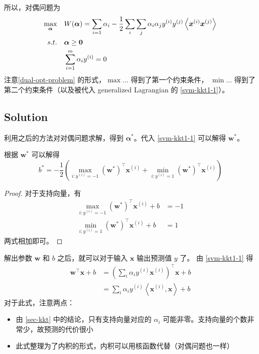 		所以，对偶问题为
		\begin{align}
			\max_{\bm{\alpha}} \quad & W(\bm{\alpha}) = \sum_{i=1}{\alpha_i} - \frac{1}{2} \sum_i \sum_j {\alpha_i \alpha_j y^{(i)} y^{(j)} \left\langle \bm{x}^{(i)} \bm{x}^{(j)} \right\rangle } \\
			s.t. \quad & \bm{\alpha} \geq \bm{0} \\
			& \sum_{i=1}^{m} \alpha_i y^{(i)} = 0
		\end{align}
		注意\eqref{dual-opt-problem} 的形式，$ \max \ldots $ 得到了第一个约束条件，
		$ \min \ldots $ 得到了第二个约束条件（以及被代入 generalized Lagrangian 的 \eqref{svm-kkt1-1}）。
		
	\subsection{Solution}
		利用之后的方法对对偶问题求解，得到 $ \bm{\alpha}^* $。代入 \eqref{svm-kkt1-1} 可以解得 $ \bm{w}^* $。
		
		根据 $ \bm{w}^* $ 可以解得
		\begin{equation}
			b^* = - \frac{1}{2} \left( \max_{i: y^{(i)} = -1} (\bm{w}^*)^\intercal \bm{x}^{(i)} + \min_{i: y^{(i)} = 1} (\bm{w}^*)^\intercal \bm{x}^{(i)} \right) \label{svm-commonly-solving-b}
		\end{equation}
		\begin{proof}
			对于支持向量，有
			\begin{align*}
				\max_{i: y^{(i)} = -1} (\bm{w}^*)^\intercal \bm{x}^{(i)} + b & = -1 \\
				\min_{i: y^{(i)} = 1} (\bm{w}^*)^\intercal \bm{x}^{(i)} + b & = 1
			\end{align*}
			两式相加即可。
		\end{proof}
		
		解出参数 $ \bm{w} $ 和 $ b $ 之后，就可以对于输入 $ \bm{x} $ 输出预测值 $ y $ 了。
		由 \eqref{svm-kkt1-1} 得
		\begin{align}
			\bm{w}^\intercal \bm{x} + b &= \left( \sum_i \alpha_i y^{(i)} \bm{x}^{(i)} \right)^\intercal \bm{x} + b \\
			&= \sum_i \alpha_i y^{(i)} \left\langle \bm{x}^{(i)}, \bm{x} \right\rangle + b
		\end{align}
		对于此式，注意两点：
		\begin{itemize}
			\item 由 \ref{sec-kkt} 中的结论，只有支持向量对应的 $ \alpha_i $ 可能非零。支持向量的个数非常少，故预测的代价很小
			\item 此式整理为了内积的形式，内积可以用核函数代替（对偶问题也一样）
		\end{itemize}
		
